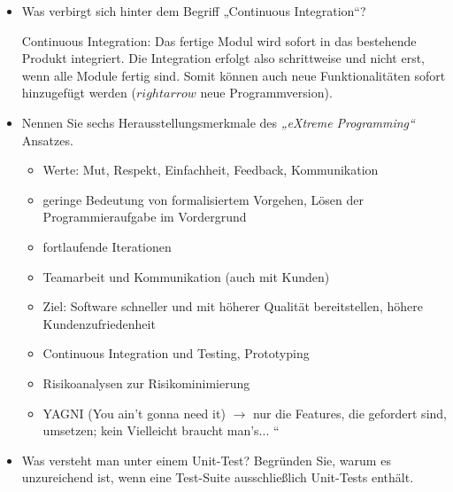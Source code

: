 \documentclass{lehramt-informatik-minimal}
\begin{document}
\begin{itemize}

%

\item Was verbirgt sich hinter dem Begriff „Continuous Integration“?

\begin{antwort}
Continuous Integration: Das fertige Modul wird sofort in das bestehende
Produkt integriert. Die Integration erfolgt also schrittweise und nicht
erst, wenn alle Module fertig sind. Somit können auch neue
Funktionalitäten sofort hinzugefügt werden ($rightarrow$ neue
Programmversion).
\end{antwort}

%

\item Nennen Sie sechs Herausstellungsmerkmale des \emph{„eXtreme
Programming“} Ansatzes.

\begin{antwort}
\begin{itemize}
\item Werte: Mut, Respekt, Einfachheit, Feedback, Kommunikation

\item geringe Bedeutung von formalisiertem Vorgehen, Lösen der
Programmieraufgabe im Vordergrund

\item fortlaufende Iterationen

\item Teamarbeit und Kommunikation (auch mit Kunden)

\item Ziel: Software schneller und mit höherer Qualität bereitstellen,
höhere Kundenzufriedenheit

\item Continuous Integration und Testing, Prototyping

\item Risikoanalysen zur Risikominimierung

\item YAGNI (You ain’t gonna need it) $\rightarrow$ nur die Features,
die gefordert sind, umsetzen; kein Vielleicht braucht man’s... “
\end{itemize}
\end{antwort}

%

\item Was versteht man unter einem Unit-Test? Begründen Sie, warum es
unzureichend ist, wenn eine Test-Suite ausschließlich Unit-Tests
enthält.


\end{itemize}
\end{document}
